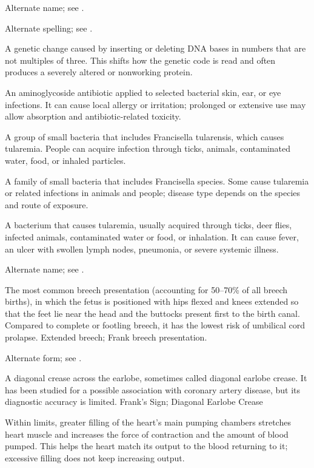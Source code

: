  Alternate name; see .

 Alternate spelling; see .

 A genetic change caused by inserting or deleting DNA bases in numbers that are not multiples of three. This shifts how the genetic code is read and often produces a severely altered or nonworking protein.

 An aminoglycoside antibiotic applied to selected bacterial skin, ear, or eye infections. It can cause local allergy or irritation; prolonged or extensive use may allow absorption and antibiotic-related toxicity.

 A group of small bacteria that includes Francisella tularensis, which causes tularemia. People can acquire infection through ticks, animals, contaminated water, food, or inhaled particles.

 A family of small bacteria that includes Francisella species. Some cause tularemia or related infections in animals and people; disease type depends on the species and route of exposure.

 A bacterium that causes tularemia, usually acquired through ticks, deer flies, infected animals, contaminated water or food, or inhalation. It can cause fever, an ulcer with swollen lymph nodes, pneumonia, or severe systemic illness.

 Alternate name; see .

 The most common breech presentation (accounting for 50--70\% of all breech births), in which the fetus is positioned with hips flexed and knees extended so that the feet lie near the head and the buttocks present first to the birth canal. Compared to complete or footling breech, it has the lowest risk of umbilical cord prolapse.
\synonyms Extended breech; Frank breech presentation.

 Alternate form; see .

 A diagonal crease across the earlobe, sometimes called diagonal earlobe crease. It has been studied for a possible association with coronary artery disease, but its diagnostic accuracy is limited.
\synonyms
Frank's Sign; Diagonal Earlobe Crease

 Within limits, greater filling of the heart’s main pumping chambers stretches heart muscle and increases the force of contraction and the amount of blood pumped. This helps the heart match its output to the blood returning to it; excessive filling does not keep increasing output.

